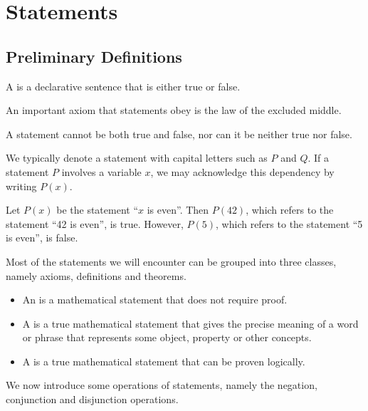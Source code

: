 \chapter{Statements}

\section{Preliminary Definitions}

\begin{definition}
    A  is a declarative sentence that is either true or false.
\end{definition}

An important axiom that statements obey is the law of the excluded middle.

\begin{axiom}
    A statement cannot be both true and false, nor can it be neither true nor false.
\end{axiom}

We typically denote a statement with capital letters such as $P$ and $Q$. If a statement $P$ involves a variable $x$, we may acknowledge this dependency by writing $P(x)$.

\begin{example}
    Let $P(x)$ be the statement ``$x$ is even''. Then $P(42)$, which refers to the statement ``42 is even'', is true. However, $P(5)$, which refers to the statement ``5 is even'', is false.
\end{example}

Most of the statements we will encounter can be grouped into three classes, namely axioms, definitions and theorems.

\begin{definition}
    \phantom{.}
    \begin{itemize}
        \item An  is a mathematical statement that does not require proof.
        \item A  is a true mathematical statement that gives the precise meaning of a word or phrase that represents some object, property or other concepts.
        \item A  is a true mathematical statement that can be proven logically.
    \end{itemize}
\end{definition}

We now introduce some operations of statements, namely the negation, conjunction and disjunction operations.

